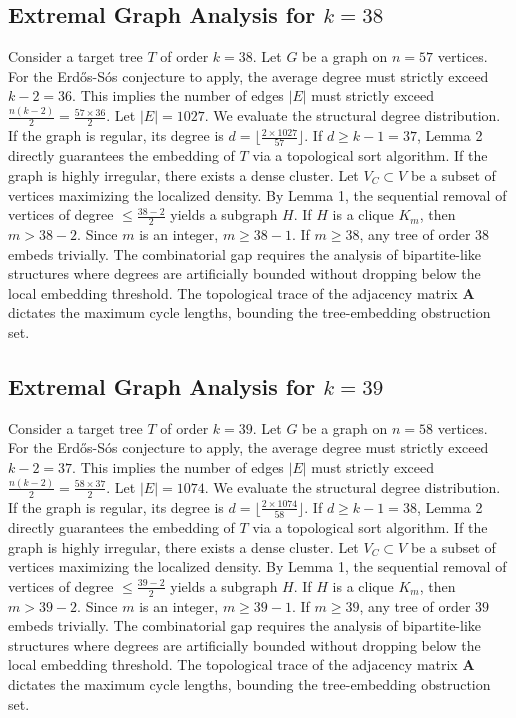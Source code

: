 \documentclass[11pt,a4paper]{article}
\begin{document}
\subsection{Extremal Graph Analysis for $k=38$}
Consider a target tree $T$ of order $k=38$.
Let $G$ be a graph on $n=57$ vertices.
For the Erd\H{o}s-S\'os conjecture to apply, the average degree must strictly exceed $k-2 = 36$.
This implies the number of edges $|E|$ must strictly exceed $\frac{n(k-2)}{2} = \frac{57 \times 36}{2}$.
Let $|E| = 1027$.
We evaluate the structural degree distribution. If the graph is regular, its degree is $d = \lfloor \frac{2 \times 1027}{57} \rfloor$.
If $d \geq k-1 = 37$, Lemma 2 directly guarantees the embedding of $T$ via a topological sort algorithm.
If the graph is highly irregular, there exists a dense cluster. Let $V_C \subset V$ be a subset of vertices maximizing the localized density.
By Lemma 1, the sequential removal of vertices of degree $\leq \frac{38-2}{2}$ yields a subgraph $H$.
If $H$ is a clique $K_{m}$, then $m > 38-2$. Since $m$ is an integer, $m \geq 38-1$. If $m \geq 38$, any tree of order $38$ embeds trivially.
The combinatorial gap requires the analysis of bipartite-like structures where degrees are artificially bounded without dropping below the local embedding threshold. The topological trace of the adjacency matrix $\mathbf{A}$ dictates the maximum cycle lengths, bounding the tree-embedding obstruction set.


\subsection{Extremal Graph Analysis for $k=39$}
Consider a target tree $T$ of order $k=39$.
Let $G$ be a graph on $n=58$ vertices.
For the Erd\H{o}s-S\'os conjecture to apply, the average degree must strictly exceed $k-2 = 37$.
This implies the number of edges $|E|$ must strictly exceed $\frac{n(k-2)}{2} = \frac{58 \times 37}{2}$.
Let $|E| = 1074$.
We evaluate the structural degree distribution. If the graph is regular, its degree is $d = \lfloor \frac{2 \times 1074}{58} \rfloor$.
If $d \geq k-1 = 38$, Lemma 2 directly guarantees the embedding of $T$ via a topological sort algorithm.
If the graph is highly irregular, there exists a dense cluster. Let $V_C \subset V$ be a subset of vertices maximizing the localized density.
By Lemma 1, the sequential removal of vertices of degree $\leq \frac{39-2}{2}$ yields a subgraph $H$.
If $H$ is a clique $K_{m}$, then $m > 39-2$. Since $m$ is an integer, $m \geq 39-1$. If $m \geq 39$, any tree of order $39$ embeds trivially.
The combinatorial gap requires the analysis of bipartite-like structures where degrees are artificially bounded without dropping below the local embedding threshold. The topological trace of the adjacency matrix $\mathbf{A}$ dictates the maximum cycle lengths, bounding the tree-embedding obstruction set.
\end{document}
